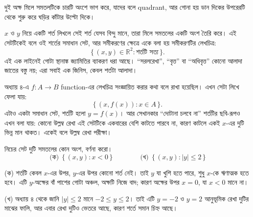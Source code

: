 \documentclass[11pt]{article}
\begin{document}
দুই অক্ষ মিলে সমতলটিকে চারটি অংশে ভাগ করে, যাদের বলে quadrant, আর গোনা হয়
ডান দিকের উপরেরটি থেকে শুরু করে ঘড়ির কাঁটার উল্টো দিকে।

\begin{center}
\end{center}

\begin{idea}[বক্ররেখা মানে সমাধান সেট]
$x$ ও $y$ নিয়ে একটি শর্ত লিখলে সেই শর্ত যেসব বিন্দু মানে, তারা মিলে সমতলের
একটি অংশ তৈরি করে। এই সেটটিকেই বলে ওই শর্তের সমাধান সেট, আর সমীকরণের ক্ষেত্রে
একে বলা হয় সমীকরণটির লেখচিত্র:
\[
  \{\, (x, y) \in \mathbb{R}^2 : \text{শর্তটি সত্য} \,\}.
\]
এই এক লাইনেই গোটা স্থানাঙ্ক জ্যামিতির ব্যাকরণ ধরা আছে। ``সরলরেখা'', ``বৃত্ত''
বা ``অধিবৃত্ত'' কোনো আলাদা জাতের বস্তু নয়; এরা সবাই এক জিনিস, কেবল শর্তটা
আলাদা।
\end{idea}

\begin{remark}
অধ্যায় ৪-এ $f \colon A \to B$ function-এর লেখচিত্র সংজ্ঞায়িত করার কথা
বলে রাখা হয়েছিল। এখন সেটা লিখে ফেলা যায়:
\[
  \{\, (x, f(x)) : x \in A \,\}.
\]
এটাও একটা সমাধান সেট, শর্তটি হলো $y = f(x)$। আর সেখানকার ``দোটানা চলবে না''
শর্তটির ছবি-রূপও এখন বলা যায়: কোনো উল্লম্ব রেখা এই সেটটিকে একবারের বেশি
কাটতে পারবে না, কারণ কাটলে একই $x$-এর দুটি ভিন্ন মান থাকত। একেই বলে
উল্লম্ব রেখা পরীক্ষা।
\end{remark}

\begin{example}
নিচের সেট দুটি সমতলের কোন অংশ, বর্ণনা করো।
\[
  \text{(ক)}\ \ \{\, (x,y) : x < 0 \,\}
  \qquad\qquad
  \text{(খ)}\ \ \{\, (x,y) : |y| \leq 2 \,\}
\]
\end{example}

\begin{solbox}
(ক) শর্তটি কেবল $x$-এর উপর, $y$-এর উপর কোনো শর্ত নেই। তাই $y$ যা খুশি হতে
পারে, শুধু $x$-কে ঋণাত্মক হতে হবে। এটি $y$-অক্ষের বাঁ পাশের গোটা অঞ্চল,
অক্ষটি নিজে বাদ; কারণ অক্ষের উপর $x = 0$, যা $x < 0$ মানে না।

(খ) অধ্যায় ৪ থেকে জানি $|y| \leq 2$ মানে $-2 \leq y \leq 2$। তাই এটি
$y = -2$ ও $y = 2$ আনুভূমিক রেখা দুটির মাঝের ফালি, আর এবার রেখা দুটিও
ভেতরে আছে, কারণ শর্তে সমান চিহ্ন আছে।
\end{solbox}
\end{document}
